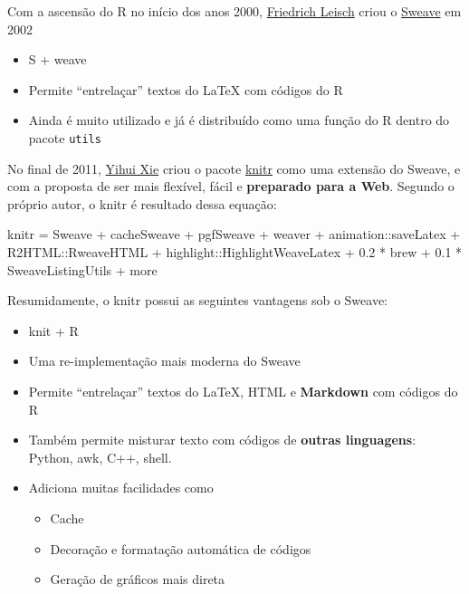 \documentclass[
  10pt,
  a4paper]{book}
\newenvironment{Shaded}{\begin{snugshade}}{\end{snugshade}}
\newcommand{\FloatTok}[1]{\textcolor[rgb]{0.00,0.00,0.81}{#1}}
\newcommand{\NormalTok}[1]{#1}
\newcommand{\OtherTok}[1]{\textcolor[rgb]{0.56,0.35,0.01}{#1}}
\newcommand{\SpecialCharTok}[1]{\textcolor[rgb]{0.00,0.00,0.00}{#1}}
\providecommand{\tightlist}{%
  \setlength{\itemsep}{0pt}\setlength{\parskip}{0pt}}
\begin{document}
Com a ascensão do R no início dos anos 2000, \href{http://www.statistik.lmu.de/~leisch}{Friedrich Leisch} criou
o \href{https://www.statistik.lmu.de/~leisch/Sweave}{Sweave} em 2002

\begin{itemize}
\tightlist
\item
  S + weave
\item
  Permite ``entrelaçar'' textos do LaTeX com códigos do R
\item
  Ainda é muito utilizado e já é distribuído como uma função do R
  dentro do pacote \texttt{utils}
\end{itemize}

No final de 2011, \href{http://yihui.name/}{Yihui Xie} criou o pacote \href{http://yihui.name/knitr}{knitr} como uma extensão
do Sweave, e com a proposta de ser mais flexível, fácil e \textbf{preparado
para a Web}. Segundo o próprio autor, o knitr é resultado dessa
equação:

\begin{Shaded}
\begin{Highlighting}[]
\NormalTok{knitr }\OtherTok{=}\NormalTok{ Sweave }\SpecialCharTok{+}\NormalTok{ cacheSweave }\SpecialCharTok{+}\NormalTok{ pgfSweave }\SpecialCharTok{+}\NormalTok{ weaver }\SpecialCharTok{+}
\NormalTok{    animation}\SpecialCharTok{::}\NormalTok{saveLatex }\SpecialCharTok{+}\NormalTok{ R2HTML}\SpecialCharTok{::}\NormalTok{RweaveHTML }\SpecialCharTok{+}
\NormalTok{    highlight}\SpecialCharTok{::}\NormalTok{HighlightWeaveLatex }\SpecialCharTok{+} \FloatTok{0.2} \SpecialCharTok{*}\NormalTok{ brew }\SpecialCharTok{+}
    \FloatTok{0.1} \SpecialCharTok{*}\NormalTok{ SweaveListingUtils }\SpecialCharTok{+}\NormalTok{ more}
\end{Highlighting}
\end{Shaded}

Resumidamente, o knitr possui as seguintes vantagens sob o Sweave:

\begin{itemize}
\tightlist
\item
  knit + R
\item
  Uma re-implementação mais moderna do Sweave
\item
  Permite ``entrelaçar'' textos do LaTeX, HTML e \textbf{Markdown} com
  códigos do R
\item
  Também permite misturar texto com códigos de \textbf{outras linguagens}:
  Python, awk, C++, shell.
\item
  Adiciona muitas facilidades como

  \begin{itemize}
  \tightlist
  \item
    Cache
  \item
    Decoração e formatação automática de códigos
  \item
    Geração de gráficos mais direta
  \end{itemize}
\end{itemize}
\end{document}
